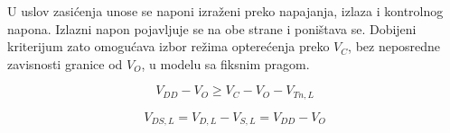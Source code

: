 U uslov zasićenja unose se naponi izraženi preko napajanja, izlaza i kontrolnog napona. Izlazni napon pojavljuje se na obe strane i poništava se. Dobijeni kriterijum zato omogućava izbor režima opterećenja preko $V_C$, bez neposredne zavisnosti granice od $V_O$, u modelu sa fiksnim pragom.

\[V_{DD}-V_O\geq V_C-V_O-V_{Tn,L}\]

\[V_{DS,L}=V_{D,L}-V_{S,L}=V_{DD}-V_O\]

